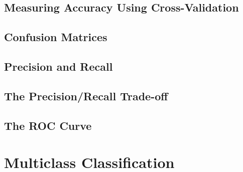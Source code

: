 \subsection{Measuring Accuracy Using Cross-Validation}
\subsection{Confusion Matrices}
\subsection{Precision and Recall}
\subsection{The Precision/Recall Trade-off}
\subsection{The ROC Curve}
\section{Multiclass Classification}
\subsection{}
\subsection{}
\section{}
\subsection{}
\subsection{}
\section{}
\section{}
\section{}
